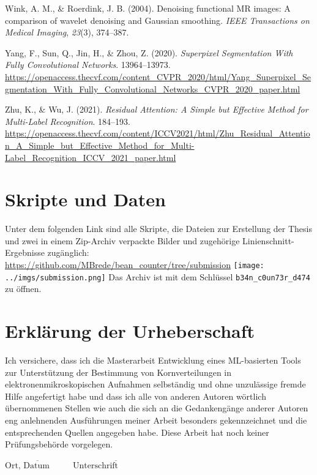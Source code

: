 \documentclass[
  12pt,
  openany]{book}
\newlength{\cslhangindent}
\newlength{\cslentryspacingunit} %
\newenvironment{CSLReferences}[2] %
 {%
  \setlength{\parindent}{0pt}
  \ifodd #1
  \let\oldpar\par
  \def\par{\hangindent=\cslhangindent\oldpar}
  \fi
  \setlength{\parskip}{#2\cslentryspacingunit}
 }%
 {}
\begin{document}
\begin{CSLReferences}{1}{0}
\leavevmode{}%
Wink, A. M., \& Roerdink, J. B. (2004). Denoising functional {MR} images: A comparison of wavelet denoising and {Gaussian} smoothing. \emph{IEEE Transactions on Medical Imaging}, \emph{23}(3), 374--387.

\leavevmode{}%
Yang, F., Sun, Q., Jin, H., \& Zhou, Z. (2020). \emph{Superpixel {Segmentation With Fully Convolutional Networks}}. 13964--13973. \url{https://openaccess.thecvf.com/content_CVPR_2020/html/Yang_Superpixel_Segmentation_With_Fully_Convolutional_Networks_CVPR_2020_paper.html}

\leavevmode{}%
Zhu, K., \& Wu, J. (2021). \emph{Residual {Attention}: {A Simple} but {Effective Method} for {Multi-Label Recognition}}. 184--193. \url{https://openaccess.thecvf.com/content/ICCV2021/html/Zhu_Residual_Attention_A_Simple_but_Effective_Method_for_Multi-Label_Recognition_ICCV_2021_paper.html}

\end{CSLReferences}

\chapter*{Skripte und Daten}

Unter dem folgenden Link sind alle Skripte, die Dateien zur Erstellung der Thesis und zwei in einem Zip-Archiv verpackte Bilder und zugehörige Linienschnitt-Ergebnisse zugänglich: \newline
\href{https://github.com/MBrede/bean_counter/tree/submission}{https://github.com/MBrede/bean\_counter/tree/submission}\newline
\texttt{[image: ../imgs/submission.png]}\newline
Das Archiv ist mit dem Schlüssel \texttt{b34n\_c0un73r\_d474} zu öffnen.



\chapter*{Erklärung der Urheberschaft}

Ich versichere, dass ich die Masterarbeit \glqq{}Entwicklung eines ML-basierten Tools zur Unterstützung der Bestimmung von Kornverteilungen in elektronenmikroskopischen Aufnahmen\grqq{} selbständig und ohne
unzulässige fremde Hilfe angefertigt habe und dass ich alle von anderen Autoren wörtlich
übernommenen Stellen wie auch die sich an die Gedankengänge anderer Autoren eng
anlehnenden Ausführungen meiner Arbeit besonders gekennzeichnet und die
entsprechenden Quellen angegeben habe.
Diese Arbeit hat noch keiner Prüfungsbehörde vorgelegen.

\vspace{4cm}

\hspace{1cm} $\overline{\text{Ort, Datum} \hspace{1cm}}$ \hspace{3cm} $\overline{\text{Unterschrift} \hspace{2cm}}$
\end{document}
